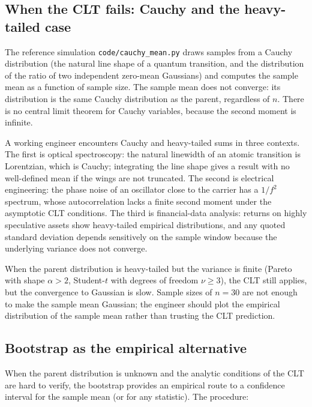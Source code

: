 \subsection{When the CLT fails: Cauchy and the heavy-tailed case}

The reference simulation \texttt{code/cauchy\_mean.py} draws samples
from a Cauchy distribution (the natural line shape of a quantum
transition, and the distribution of the ratio of two independent
zero-mean Gaussians) and computes the sample mean as a function of
sample size. The sample mean does not converge: its distribution is
the same Cauchy distribution as the parent, regardless of $n$.
There is no central limit theorem for Cauchy variables, because
the second moment is infinite.

A working engineer encounters Cauchy and heavy-tailed sums in three
contexts. The first is optical spectroscopy: the natural linewidth
of an atomic transition is Lorentzian, which is Cauchy; integrating
the line shape gives a result with no well-defined mean if the
wings are not truncated. The second is electrical engineering: the
phase noise of an oscillator close to the carrier has a $1/f^{2}$
spectrum, whose autocorrelation lacks a finite second moment under
the asymptotic CLT conditions. The third is financial-data analysis:
returns on highly speculative assets show heavy-tailed empirical
distributions, and any quoted standard deviation depends sensitively
on the sample window because the underlying variance does not
converge.

When the parent distribution is heavy-tailed but the variance is
finite (Pareto with shape $\alpha > 2$, Student-$t$ with degrees of
freedom $\nu \geq 3$), the CLT still applies, but the convergence
to Gaussian is slow. Sample sizes of $n = 30$ are not enough to
make the sample mean Gaussian; the engineer should plot the
empirical distribution of the sample mean rather than trusting the
CLT prediction.

\subsection{Bootstrap as the empirical alternative}

When the parent distribution is unknown and the analytic conditions
of the CLT are hard to verify, the bootstrap provides an empirical
route to a confidence interval for the sample mean (or for any
statistic). The procedure:

